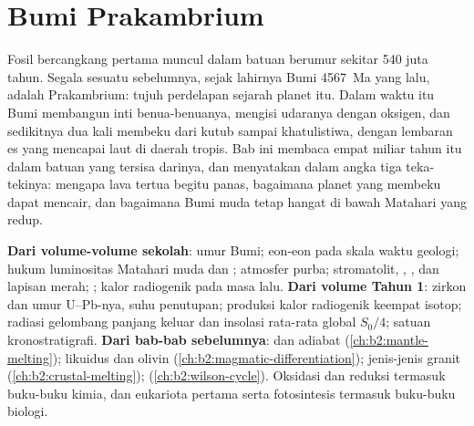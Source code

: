 \chapter{Bumi Prakambrium}\label{ch:b2:precambrian-earth}

Fosil bercangkang pertama muncul dalam batuan berumur sekitar 540 juta tahun. Segala sesuatu sebelumnya, sejak
lahirnya Bumi \qty{4567}{Ma} yang lalu, adalah Prakambrium: tujuh perdelapan sejarah
planet itu. Dalam waktu itu Bumi membangun inti benua-benuanya, mengisi udaranya dengan oksigen,
dan sedikitnya dua kali membeku dari kutub sampai khatulistiwa, dengan lembaran es yang mencapai laut
di daerah tropis. Bab ini membaca empat miliar tahun itu dalam batuan yang tersisa darinya,
dan menyatakan dalam angka tiga teka-tekinya: mengapa lava tertua begitu panas, bagaimana planet yang membeku
dapat mencair, dan bagaimana Bumi muda tetap hangat di bawah Matahari yang redup.

\begin{recall}
\textbf{Dari volume-volume sekolah}: umur Bumi; eon-eon pada skala waktu geologi;
hukum luminositas Matahari muda dan ; atmosfer purba;
stromatolit, , , dan lapisan merah; ;
kalor radiogenik pada masa lalu. \textbf{Dari volume Tahun 1}: zirkon dan umur U--Pb-nya,
suhu penutupan; produksi kalor radiogenik keempat isotop; radiasi gelombang panjang keluar
dan insolasi rata-rata global $S_0/4$; satuan kronostratigrafi.
\textbf{Dari bab-bab sebelumnya}:  dan adiabat
(\cref{ch:b2:mantle-melting}); likuidus dan  olivin
(\cref{ch:b2:magmatic-differentiation}); jenis-jenis granit (\cref{ch:b2:crustal-melting});
 (\cref{ch:b2:wilson-cycle}). Oksidasi dan reduksi termasuk buku-buku
kimia, dan eukariota pertama serta fotosintesis termasuk buku-buku biologi.
\end{recall}

